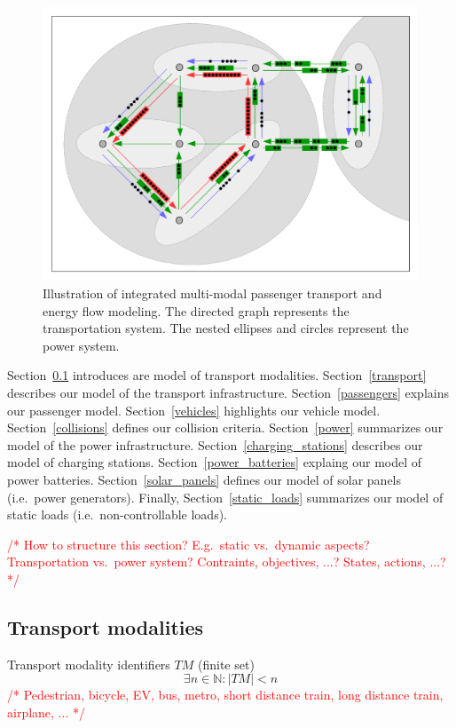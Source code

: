 \documentclass[conference]{IEEEtran}
\newcommand{\todo}[1]{\textcolor{red}{/* #1 */}}
\begin{document}
	\begin{figure}
		\centering
		\includegraphics[width=\columnwidth]{gfx/model.pdf}
		\caption{Illustration of integrated multi-modal passenger transport and energy flow modeling. The directed graph represents the transportation system. The nested ellipses and circles represent the power system.}
		\label{illustration}
	\end{figure}
	
	Section~\ref{modalities} introduces are model of transport modalities. Section~\ref{transport} describes our model of the transport infrastructure. Section~\ref{passengers} explains our passenger model. Section~\ref{vehicles} highlights our vehicle model. Section~\ref{collisions} defines our collision criteria. Section~\ref{power} summarizes our model of the power infrastructure. Section~\ref{charging_stations} describes our model of charging stations. Section~\ref{power_batteries} explaing our model of power batteries. Section~\ref{solar_panels} defines our model of solar panels (i.e.\ power generators). Finally, Section~\ref{static_loads} summarizes our model of static loads (i.e.\ non-controllable loads).
	
	\todo{How to structure this section? E.g.\ static vs.\ dynamic aspects? Transportation vs.\ power system? Contraints, objectives, ...? States, actions, ...?}
	
	\subsection{Transport modalities}
	\label{modalities}
	
	Transport modality identifiers $TM$ (finite set)
	\[
		 \exists n \in \mathbb{N} : |TM| < n
	\]
	\todo{Pedestrian, bicycle, EV, bus, metro, short distance train, long distance train, airplane, ...}
	
\end{document}
